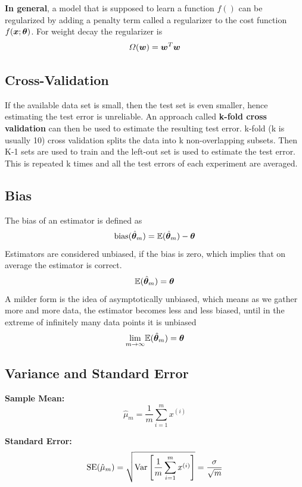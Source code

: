 \begin{multicols}{2}
	\textbf{In general}, a model that is supposed to learn a function $f()$ can be regularized by adding a penalty term called a regularizer to the cost function $f(\bol{x};\bol{\theta})$.
	For weight decay the regularizer is
	\[ \Omega(\bol{w}) = \bol{w}^T\bol{w} \]
	
	\subsection{Cross-Validation}
	If the available data set is small, then the test set is even smaller, hence estimating the test error is unreliable.
	An approach called \textbf{k-fold cross validation} can then be used to estimate the resulting test error.
	k-fold (k is usually 10) cross validation splits the data into k non-overlapping subsets. 
	Then K-1 sets are used to train and the left-out set is used to estimate the test error.
	This is repeated k times and all the test errors of each experiment are averaged.
	
	\subsection{Bias}
	The bias of an estimator is defined as
	\[ \text{bias}(\hat{\bol{\theta}}_m) = \Exp (\hat{\bol{\theta}}_m)-\bol{\theta} \]
	Estimators are considered unbiased, if the bias is zero, which implies that on average the estimator is correct.
	\[ \Exp (\hat{\bol{\theta}}_m) = \bol{\theta} \]
	A milder form is the idea of asymptotically unbiased, which means as we gather more and more data, the estimator becomes less and less biased, until in the extreme of infinitely many data points it is unbiased
	\[ \underset{m\rightarrow\infty}{\lim} \Exp (\hat{\bol{\theta}}_m) = \bol{\theta} \]
	
%
		
	\subsection{Variance and Standard Error}	
	\textbf{Sample Mean:}
	\[ \hat{\mu}_m = \frac{1}{m} \sum_{i=1}^{m} x^{(i)} \]
	
	\textbf{Standard Error:}
	\[ \text{SE}(\hat{\mu}_m) = \sqrt{\text{Var}\left[\frac{1}{m}\sum_{i=1}^{m}x^{(i)}\right]} 
	= \frac{\sigma}{\sqrt{m}} \]
		

\end{multicols}
